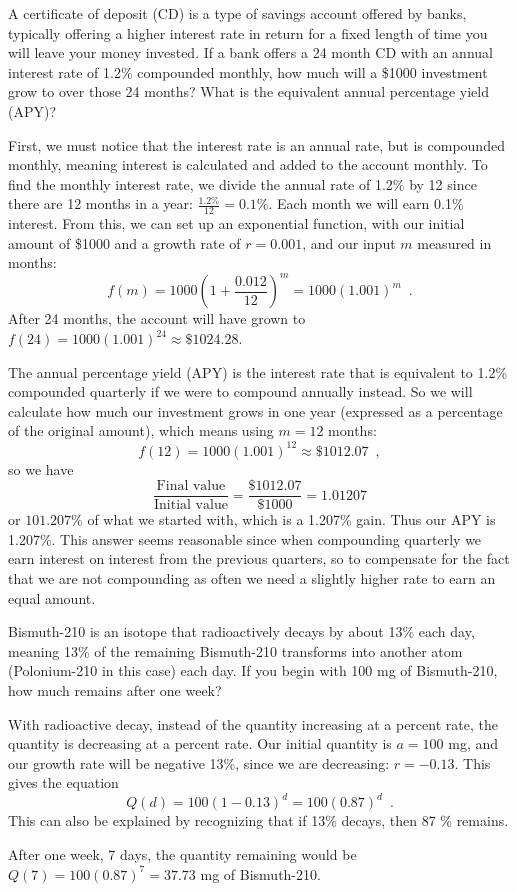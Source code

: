\begin{example}
A certificate of deposit (CD) is a type of savings account offered by banks, typically offering a higher interest rate in return for a fixed length of time you will leave your money invested. If a bank offers a 24 month CD with an annual interest rate of 1.2\% compounded monthly, how much will a \$1000 investment grow to over those 24 months? What is the equivalent annual percentage yield (APY)?

\solution First, we must notice that the interest rate is an annual rate, but is compounded monthly, meaning interest is calculated and added to the account monthly. To find the monthly interest rate, we divide the annual rate of 1.2\% by 12 since there are 12 months in a year: $\frac{1.2\%}{12} = 0.1\%$. Each month we will earn 0.1\% interest. From this, we can set up an exponential function, with our initial amount of \$1000 and a growth rate of $r=0.001$, and our input $m$ measured in months:
$$f(m)=1000\left(1+\frac{0.012}{12}\right)^m=1000(1.001)^m \enspace .$$
After 24 months, the account will have grown to $f(24)=1000(1.001)^{24}\approx\$1024.28.$

The annual percentage yield (APY) is the interest rate that is equivalent to 1.2\% compounded quarterly if we were to compound annually instead. So we will calculate how much our investment grows in one year (expressed as a percentage of the original amount), which means using $m=12$ months:
$$f(12)=1000(1.001)^{12}\approx\$1012.07 \enspace ,$$
so we have
$$\frac{\mbox{Final value}}{\mbox{Initial value}} = \frac{\$1012.07}{\$1000}=1.01207$$
or $101.207\%$ of what we started with, which is a 1.207\% gain. Thus our APY is 1.207\%. This answer seems reasonable since when compounding quarterly we earn interest on interest from the previous quarters, so to compensate for the fact that we are not compounding as often we need a slightly higher rate to earn an equal amount.
\end{example}

\begin{example}
Bismuth-210 is an isotope that radioactively decays by about 13\% each day, meaning 13\% of the remaining Bismuth-210 transforms into another atom (Polonium-210 in this case) each day. If you begin with 100 mg of Bismuth-210, how much remains after one week?

\solution With radioactive decay, instead of the quantity increasing at a percent rate, the quantity is decreasing at a percent rate. Our initial quantity is $a=100$ mg, and our growth rate will be negative 13\%, since we are decreasing: $r=-0.13$. This gives the equation
$$Q(d)=100(1-0.13)^d=100(0.87)^d \enspace .$$
This can also be explained by recognizing that if 13\% decays, then 87 \% remains.

After one week, 7 days, the quantity remaining would be $Q(7)=100(0.87)^7=37.73$ mg of Bismuth-210.
\end{example}

